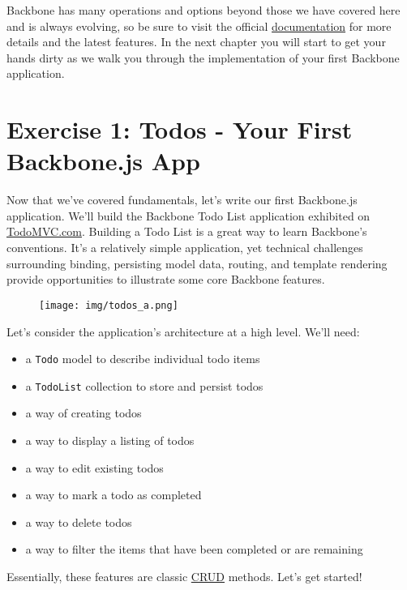 \documentclass[9pt]{book}
\begin{document}
Backbone has many operations and options beyond those we have covered
here and is always evolving, so be sure to visit the official
\href{http://backbonejs.org/}{documentation} for more details and the
latest features. In the next chapter you will start to get your hands
dirty as we walk you through the implementation of your first Backbone
application.

\section{Exercise 1: Todos - Your First Backbone.js
App}\label{exercise-1-todos---your-first-backbone.js-app}

Now that we've covered fundamentals, let's write our first Backbone.js
application. We'll build the Backbone Todo List application exhibited on
\href{http://todomvc.com}{TodoMVC.com}. Building a Todo List is a great
way to learn Backbone's conventions. It's a relatively simple
application, yet technical challenges surrounding binding, persisting
model data, routing, and template rendering provide opportunities to
illustrate some core Backbone features.

\begin{figure}[htbp]
\centering
\texttt{[image: img/todos\_a.png]}
\end{figure}

Let's consider the application's architecture at a high level. We'll
need:

\begin{itemize}
\itemsep1pt\parskip0pt
\item
  a \texttt{Todo} model to describe individual todo items
\item
  a \texttt{TodoList} collection to store and persist todos
\item
  a way of creating todos
\item
  a way to display a listing of todos
\item
  a way to edit existing todos
\item
  a way to mark a todo as completed
\item
  a way to delete todos
\item
  a way to filter the items that have been completed or are remaining
\end{itemize}

Essentially, these features are classic
\href{http://en.wikipedia.org/wiki/Create,_read,_update_and_delete}{CRUD}
methods. Let's get started!
\end{document}
